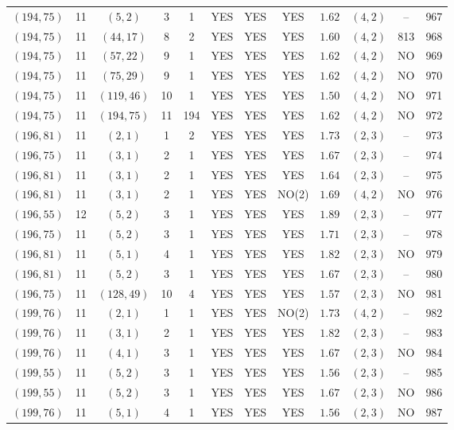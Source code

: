 \begin{longtable}{|c|c|c|c|c|c|c|c|c|c|c|c|}
$(194,75)$ & 11 & $(5,2)$ & 3 & 1 & YES & YES & YES & $1.62$ & $(4,2)$ & -- & 967\\
$(194,75)$ & 11 & $(44,17)$ & 8 & 2 & YES & YES & YES & $1.60$ & $(4,2)$ & 813 & 968\\
$(194,75)$ & 11 & $(57,22)$ & 9 & 1 & YES & YES & YES & $1.62$ & $(4,2)$ & NO & 969\\
$(194,75)$ & 11 & $(75,29)$ & 9 & 1 & YES & YES & YES & $1.62$ & $(4,2)$ & NO & 970\\
$(194,75)$ & 11 & $(119,46)$ & 10 & 1 & YES & YES & YES & $1.50$ & $(4,2)$ & NO & 971\\
$(194,75)$ & 11 & $(194,75)$ & 11 & 194 & YES & YES & YES & $1.62$ & $(4,2)$ & NO & 972\\
$(196,81)$ & 11 & $(2,1)$ & 1 & 2 & YES & YES & YES & $1.73$ & $(2,3)$ & -- & 973\\
$(196,75)$ & 11 & $(3,1)$ & 2 & 1 & YES & YES & YES & $1.67$ & $(2,3)$ & -- & 974\\
$(196,81)$ & 11 & $(3,1)$ & 2 & 1 & YES & YES & YES & $1.64$ & $(2,3)$ & -- & 975\\
$(196,81)$ & 11 & $(3,1)$ & 2 & 1 & YES & YES & NO(2) & $1.69$ & $(4,2)$ & NO & 976\\
$(196,55)$ & 12 & $(5,2)$ & 3 & 1 & YES & YES & YES & $1.89$ & $(2,3)$ & -- & 977\\
$(196,75)$ & 11 & $(5,2)$ & 3 & 1 & YES & YES & YES & $1.71$ & $(2,3)$ & -- & 978\\
$(196,81)$ & 11 & $(5,1)$ & 4 & 1 & YES & YES & YES & $1.82$ & $(2,3)$ & NO & 979\\
$(196,81)$ & 11 & $(5,2)$ & 3 & 1 & YES & YES & YES & $1.67$ & $(2,3)$ & -- & 980\\
$(196,75)$ & 11 & $(128,49)$ & 10 & 4 & YES & YES & YES & $1.57$ & $(2,3)$ & NO & 981\\
$(199,76)$ & 11 & $(2,1)$ & 1 & 1 & YES & YES & NO(2) & $1.73$ & $(4,2)$ & -- & 982\\
$(199,76)$ & 11 & $(3,1)$ & 2 & 1 & YES & YES & YES & $1.82$ & $(2,3)$ & -- & 983\\
$(199,76)$ & 11 & $(4,1)$ & 3 & 1 & YES & YES & YES & $1.67$ & $(2,3)$ & NO & 984\\
$(199,55)$ & 11 & $(5,2)$ & 3 & 1 & YES & YES & YES & $1.56$ & $(2,3)$ & -- & 985\\
$(199,55)$ & 11 & $(5,2)$ & 3 & 1 & YES & YES & YES & $1.67$ & $(2,3)$ & NO & 986\\
$(199,76)$ & 11 & $(5,1)$ & 4 & 1 & YES & YES & YES & $1.56$ & $(2,3)$ & NO & 987\\

\end{longtable}
